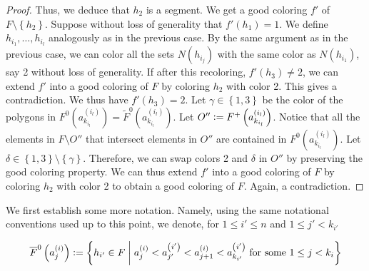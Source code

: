 \documentclass[12pt]{article}
\theoremstyle{definition}
\newcommand{\defeq}{\vcentcolon=}
\begin{document}
\begin{proof}
         Thus, we deduce that $h_2$ is a segment.
         We get a good coloring $f'$ of
         $F \setminus \left\{h_2\right\}$.
         Suppose without loss of generality
         that $f'\left(h_1\right) = 1$.
         We define $h_{i_1}, \ldots, h_{i_{l}}$ 
         analogously as in the previous case.
         By the same argument as in the previous case,
         we can color all the sets 
         $N\left(h_{i_{j}}\right)$ with the
         same color as $N\left(h_{i_1}\right)$,
         say 2 without loss of generality.
         If after this recoloring,
         $f'\left(h_3\right) \neq 2$, 
         we can extend $f'$ into a
         good coloring of $F$ by 
         coloring $h_2$ with color 2.
         This gives a contradiction.
         We thus have $f'\left(h_3\right) = 2$.
         Let $\gamma \in \left\{1, 3\right\}$
         be the color of the polygons
         in $F^{0}\left(a_{k_{i_{l}}}^{\left(i_{l}\right)}\right)
         = \widetilde{F}^{0}\left(
         a_{k_{i_{l}}}^{\left(i_{l}\right)}\right)$.
         Let $O'' \defeq F^{+}\left(
         a_{k_{i_{l}}}^{\left(i_{l}\right)}\right)$.
         Notice that all the elements
         in $F \setminus O''$ 
         that intersect elements in $O''$
         are contained in $F^{0}\left(
         a_{k_{i_{l}}}^{\left(i_{l}\right)}\right)$.
         Let $\delta \in \left\{1, 3\right\}
         \setminus \left\{\gamma\right\}$.
         Therefore, we can swap colors
         2 and $\delta$ in $O''$
         by preserving the good coloring property.
         We can thus extend $f'$ into a
         good coloring of $F$ by
         coloring $h_2$ with color 2
         to obtain a good coloring of $F$.
         Again, a contradiction.
     \end{proof}

     We first establish some more notation.
     Namely, using the same notational conventions
     used up to this point, we denote, for
     $1 \leq i' \leq n$ and $1 \leq j' < k_{i'}$

     \begin{gather*}
         \overline{F}^{0}\left(a_{j}^{\left(i\right)}\right) \defeq
         \left\{h_{i'} \in F \;\middle|\;
         a_{j}^{\left(i\right)} <
         a_{j'}^{\left(i'\right)} <
         a_{j+1}^{\left(i\right)} <
         a_{k_{i'}}^{\left(i'\right)}
         \text{ for some }
         1 \leq j < k_{i}\right\}
     \end{gather*}
\end{document}
